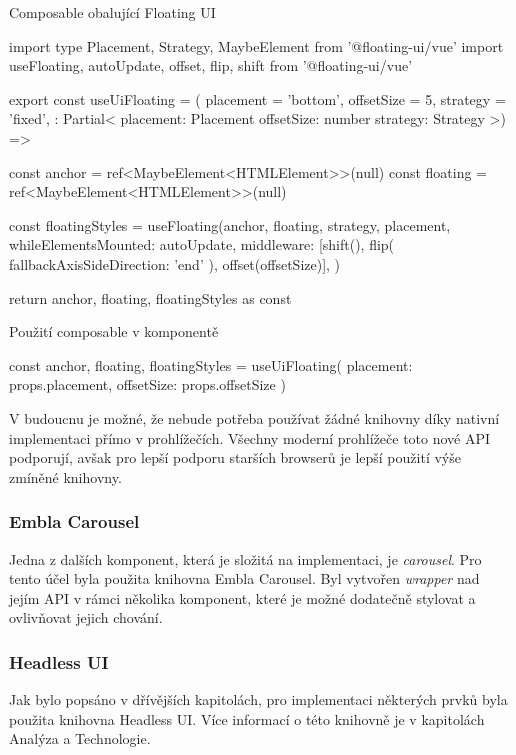 \begin{listing}[H]
    \caption{Composable obalující Floating UI}
    \label{lst:floating-ui}
    \begin{code}
import type { Placement, Strategy, MaybeElement } from '@floating-ui/vue'
import { useFloating, autoUpdate, offset, flip, shift } from '@floating-ui/vue'

export const useUiFloating = ({
  placement = 'bottom',
  offsetSize = 5,
  strategy = 'fixed',
}: Partial<{
  placement: Placement
  offsetSize: number
  strategy: Strategy
}>) => {
  const anchor = ref<MaybeElement<HTMLElement>>(null)
  const floating = ref<MaybeElement<HTMLElement>>(null)

  const { floatingStyles } = useFloating(anchor, floating, {
    strategy,
    placement,
    whileElementsMounted: autoUpdate,
    middleware: [shift(), flip({ fallbackAxisSideDirection: 'end' }), offset(offsetSize)],
  })

  return { anchor, floating, floatingStyles } as const
}
\end{code}
\end{listing}

\begin{listing}[H]
    \caption{Použití composable v komponentě}
    \label{lst:floating-ui-usage}
    \begin{code}
const { anchor, floating, floatingStyles } = useUiFloating({ placement: props.placement, offsetSize: props.offsetSize })
\end{code}
\end{listing}

V budoucnu je možné, že nebude potřeba používat žádné knihovny díky nativní implementaci přímo v prohlížečích. Všechny moderní prohlížeče toto nové API podporují, avšak pro lepší podporu starších browserů je lepší použití výše zmíněné knihovny. \cite{PopoverAPI}

\subsubsection{Embla Carousel}
Jedna z dalších komponent, která je složitá na implementaci, je \emph{carousel}. Pro tento účel byla použita knihovna Embla Carousel. Byl vytvořen \emph{wrapper} nad jejím API v rámci několika komponent, které je možné dodatečně stylovat a ovlivňovat jejich chování.

\subsubsection{Headless UI}
Jak bylo popsáno v dřívějších kapitolách, pro implementaci některých prvků byla použita knihovna Headless UI. Více informací o této knihovně je v kapitolách Analýza a Technologie.

